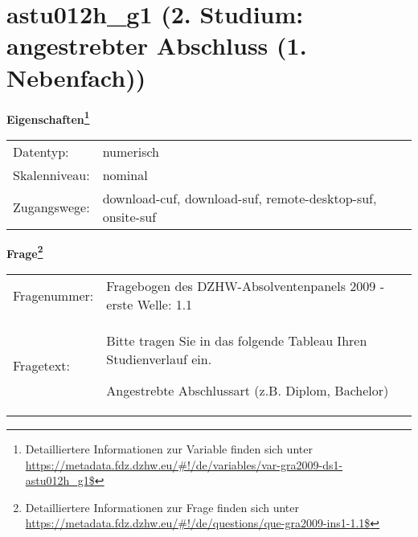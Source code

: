 
    \setcounter{footnote}{0}

    \vspace*{-1.8cm}
	\section{astu012h\_g1 (2. Studium: angestrebter Abschluss (1. Nebenfach))}
	\label{section:astu012h_g1}



    \vspace*{0.5cm}
    \noindent\textbf{Eigenschaften\footnote{Detailliertere Informationen zur Variable finden sich unter
		\url{https://metadata.fdz.dzhw.eu/\#!/de/variables/var-gra2009-ds1-astu012h_g1$}}}\\
	\begin{tabularx}{\hsize}{@{}lX}
	Datentyp: & numerisch \\
	Skalenniveau: & nominal \\
	Zugangswege: &
	  download-cuf, 
	  download-suf, 
	  remote-desktop-suf, 
	  onsite-suf
 \\
    \end{tabularx}



				\vspace*{0.5cm}
                \noindent\textbf{Frage\footnote{Detailliertere Informationen zur Frage finden sich unter
		              \url{https://metadata.fdz.dzhw.eu/\#!/de/questions/que-gra2009-ins1-1.1$}}}\\
				\begin{tabularx}{\hsize}{@{}lX}
					Fragenummer: &
					  Fragebogen des DZHW-Absolventenpanels 2009 - erste Welle:
					  1.1
 \\
					Fragetext: & Bitte tragen Sie in das folgende Tableau Ihren Studienverlauf ein.\par  Angestrebte Abschlussart (z.B. Diplom, Bachelor) \\
				\end{tabularx}





